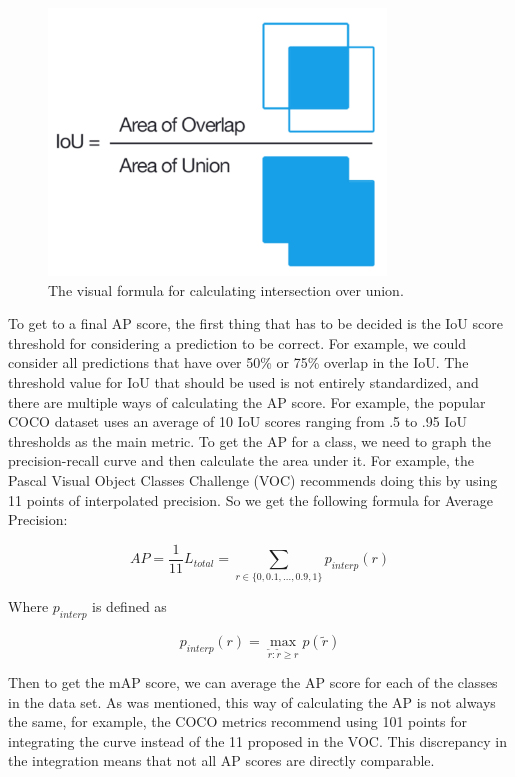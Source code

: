 \begin{figure}[h!]
    \centering
    \includegraphics[width=0.8\textwidth]{imgs/intersection_over_union.png}
    \caption{The visual formula for calculating intersection over union.}
\end{figure}

To get to a final AP score, the first thing that has to be decided is the IoU score threshold for considering a prediction to be correct.
For example, we could consider all predictions that have over 50\% or 75\% overlap in the IoU.
The threshold value for IoU that should be used is not entirely standardized, and there are multiple ways of calculating the AP score.
For example, the popular COCO dataset \citep{COCO} uses an average of 10 IoU scores ranging from .5 to .95 IoU thresholds as the main metric.
To get the AP for a class, we need to graph the precision-recall curve and then calculate the area under it.
For example, the Pascal Visual Object Classes Challenge (VOC) \citep{PVOC} recommends doing this by using 11 points of interpolated precision.
So we get the following formula for Average Precision:

\[AP = \frac{1} {11} L_{total} = \sum_{r \in \{0, 0.1, \ldots, 0.9 , 1\}}{p_{interp}(r)}\] \noindent

Where $p_{interp}$ is defined as

\[p_{interp}(r) = \max \limits_{\tilde{r}:\tilde{r} \geq r} p(\tilde{r})\]

Then to get the mAP score, we can average the AP score for each of the classes in the data set.
As was mentioned, this way of calculating the AP is not always the same, for example, the COCO metrics \citep{COCO_SITE} recommend using 101 points for integrating the curve instead of the 11 proposed in the VOC.
This discrepancy in the integration means that not all AP scores are directly comparable.

